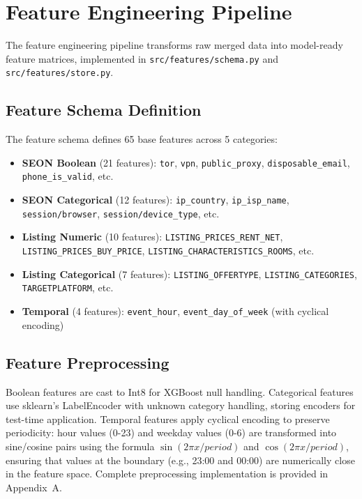 \section{Feature Engineering Pipeline}
\label{sec:4_4}

The feature engineering pipeline transforms raw merged data into model-ready feature matrices, implemented in \texttt{src/features/schema.py} and \texttt{src/features/store.py}.

\subsection{Feature Schema Definition}
\label{sec:4_4_1}

The feature schema defines 65 base features across 5 categories:

\begin{itemize}
    \item \textbf{SEON Boolean} (21 features): \texttt{tor}, \texttt{vpn}, \texttt{public\_proxy}, \texttt{disposable\_email}, \texttt{phone\_is\_valid}, etc.
    \item \textbf{SEON Categorical} (12 features): \texttt{ip\_country}, \texttt{ip\_isp\_name}, \texttt{session/browser}, \texttt{session/device\_type}, etc.
    \item \textbf{Listing Numeric} (10 features): \texttt{LISTING\_PRICES\_RENT\_NET}, \texttt{LISTING\_PRICES\_BUY\_PRICE}, \texttt{LISTING\_CHARACTERISTICS\_ROOMS}, etc.
    \item \textbf{Listing Categorical} (7 features): \texttt{LISTING\_OFFERTYPE}, \texttt{LISTING\_CATEGORIES}, \texttt{TARGETPLATFORM}, etc.
    \item \textbf{Temporal} (4 features): \texttt{event\_hour}, \texttt{event\_day\_of\_week} (with cyclical encoding)
\end{itemize}

\subsection{Feature Preprocessing}
\label{sec:4_4_2}

Boolean features are cast to Int8 for XGBoost null handling. Categorical features use sklearn's LabelEncoder with unknown category handling, storing encoders for test-time application. Temporal features apply cyclical encoding to preserve periodicity: hour values (0-23) and weekday values (0-6) are transformed into sine/cosine pairs using the formula $\sin(2\pi x / period)$ and $\cos(2\pi x / period)$, ensuring that values at the boundary (e.g., 23:00 and 00:00) are numerically close in the feature space. Complete preprocessing implementation is provided in Appendix~A.

